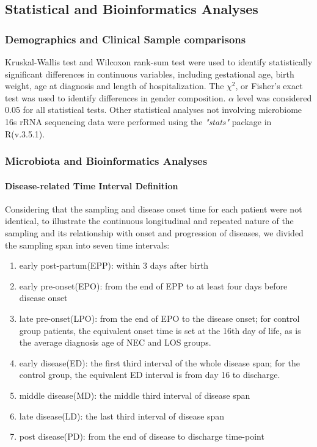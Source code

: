 \documentclass[fleqn,10pt, lineno]{wlpeerj} %
\begin{document}
  \subsection*{Statistical and Bioinformatics Analyses}
    \subsubsection*{Demographics and Clinical Sample comparisons}
    Kruskal-Wallis test and Wilcoxon rank-sum test were used to identify statistically significant differences in continuous variables, including gestational age, birth weight, age at diagnosis and length of hospitalization. The $\chi^2$, or Fisher's exact test was used to identify differences in gender composition. $\alpha$ level was considered 0.05 for all statistical tests. Other statistical analyses not involving microbiome 16s rRNA sequencing data were performed using the \textit{"stats"} package in R(v.3.5.1).
    \subsubsection*{Microbiota and Bioinformatics Analyses}
      \paragraph*{Disease-related Time Interval Definition}
      Considering that the sampling and disease onset time for each patient were not identical, to illustrate the continuous longitudinal and repeated nature of the sampling and its relationship with onset and progression of diseases, we divided  the sampling span into seven time intervals:
        \begin{enumerate}[noitemsep]
          \item early post-partum(EPP): within 3 days after birth
          \item early pre-onset(EPO): from the end of EPP to at least four days before disease onset
          \item late pre-onset(LPO): from the end of EPO to the disease onset; for control group patients, the equivalent onset time is set at the 16th day of life, as is the average diagnosis age of NEC and LOS groups.
          \item early disease(ED): the first third interval of the whole disease span; for the control group, the equivalent ED interval is from  day 16 to discharge.
          \item middle disease(MD): the middle third interval of disease span
          \item late disease(LD): the last third interval of disease span
          \item post disease(PD): from the end of disease to discharge time-point
        \end{enumerate}
\end{document}
